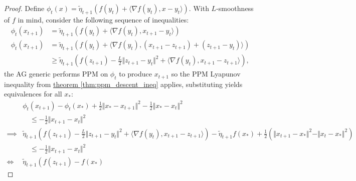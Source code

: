 \documentclass[12pt]{article}
\begin{document}
        \begin{proof}
            Define $\phi_t(x) = \tilde \eta_{t +1}(f(y_t) + \langle \nabla f(y_t), x- y_t\rangle)$.  
            With $L$-smoothness of $f$ in mind, consider the following sequence of inequalities: 
            $$
            \begin{aligned}
                \phi_t(x_{t + 1}) 
                &= 
                \tilde\eta_{t + 1} (f(y_t) + \langle \nabla f(y_t), x_{t + 1} - y_t\rangle)
                \\
                \phi_t (x_{t + 1}) &= \tilde \eta_{t + 1}(
                    f(y_t) + \langle \nabla f(y_t), (x_{t +1} - z_{t + 1}) + (z_{t + 1} - y_t) \rangle
                )
                \\
                &\ge 
                \tilde \eta_{t + 1}
                \left(
                    f(z_{t + 1}) - \frac{L}{2} \Vert z_{t + 1} - y_t\Vert^2 + 
                    \langle \nabla f(y_t), x_{t +1} - z_{t + 1}\rangle
                \right), 
            \end{aligned}
            $$
            the AG generic performs PPM on $\phi_t$ to produce $x_{t + 1}$ so the PPM Lyapunov inequality from 
            \hyperref[thm:ppm_descent_ineq]{theorem \ref*{thm:ppm_descent_ineq}} applies,
            substituting yields equivalences for all $x_*$: 
            {\footnotesize
            \begin{align*}
                & \phi_t(x_{t + 1}) - \phi_t(x_*) + \frac{1}{2}\Vert x_* - x_{t + 1}\Vert^2 
                - \frac{1}{2}\Vert x_* - x_t\Vert^2 
                \\
                &\quad \le 
                - \frac{1}{2} \Vert x_{t + 1} - x_t\Vert^2 
                \\
                \implies & 
                \tilde \eta_{t + 1}\left(
                    f(z_{t + 1}) - \frac{L}{2}\Vert z_{t + 1} - y_t\Vert^2 
                    + 
                    \langle \nabla f(y_t), x_{t + 1} - z_{t + 1}\rangle
                \right) - \tilde \eta_{t + 1} f(x_*)
                + 
                \frac{1}{2}\left(
                    \Vert x_{t + 1} - x_*\Vert^2 - \Vert x_{t} - x_*\Vert^2
                \right)
                \\
                &\quad \le
                 - \frac{1}{2}\Vert x_{t + 1} - x_t\Vert^2 
                \\
                \iff 
                & 
                \tilde \eta_{t + 1} \left(
                    f(z_{t + 1}) - f(x_*)

\end{align*}}
\end{proof}
\end{document}
